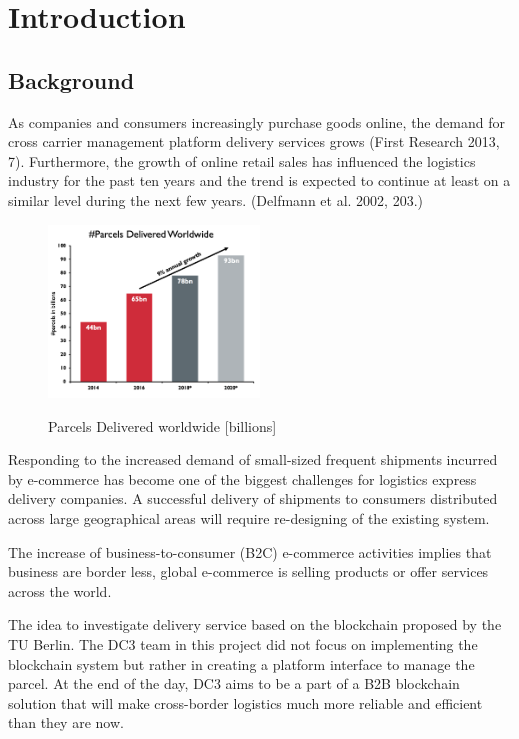\chapter{Introduction}
\label{cha:introduction}


\section{Background}

As companies and consumers increasingly purchase goods online, the demand for cross carrier management platform
delivery services grows (First Research 2013, 7). Furthermore, the growth of online retail
sales has influenced the logistics industry for the past ten years and the trend is expected to
continue at least on a similar level during the next few years. (Delfmann et al. 2002, 203.) 

\begin{figure}[!ht]
	\centering
	\includegraphics[width=0.5\textwidth]{images/ParcelsDel.png}\\
	\caption{Parcels Delivered worldwide [billions]}
	\label{fig:introduction__loremipsum}
\end{figure}

Responding to the increased demand of small-sized frequent shipments incurred by e-commerce has become one of the biggest challenges for logistics express delivery companies.
A successful delivery of shipments to consumers distributed across large geographical areas
will require re-designing of the existing system.

The increase of business-to-consumer (B2C) e-commerce activities implies that business are border less, global e-commerce is selling products or offer services across the world.


The idea to investigate delivery service based on the  blockchain proposed by the TU Berlin. The DC3 team in this project did not focus on implementing the blockchain system but rather in creating a platform interface to manage the parcel. At the end of the day, DC3 aims to be a part of a B2B blockchain solution that will make cross-border logistics much more reliable and efficient than they are now.   

